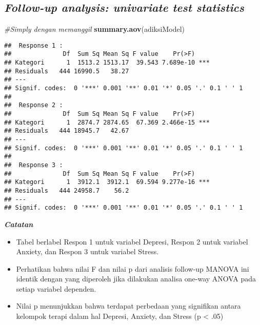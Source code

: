 \documentclass[
]{article}
\newenvironment{Shaded}{\begin{snugshade}}{\end{snugshade}}
\newcommand{\CommentTok}[1]{\textcolor[rgb]{0.56,0.35,0.01}{\textit{#1}}}
\newcommand{\KeywordTok}[1]{\textcolor[rgb]{0.13,0.29,0.53}{\textbf{#1}}}
\newcommand{\NormalTok}[1]{#1}
\begin{document}
\hypertarget{follow-up-analysis-univariate-test-statistics}{%
\subsection{\texorpdfstring{\emph{Follow-up analysis: univariate test
statistics}}{Follow-up analysis: univariate test statistics}}\label{follow-up-analysis-univariate-test-statistics}}

\begin{Shaded}
\begin{Highlighting}[]
\CommentTok{#Simply dengan memanggil }
\KeywordTok{summary.aov}\NormalTok{(adiksiModel)}
\end{Highlighting}
\end{Shaded}

\begin{verbatim}
##  Response 1 :
##              Df  Sum Sq Mean Sq F value    Pr(>F)    
## Kategori      1  1513.2 1513.17  39.543 7.689e-10 ***
## Residuals   444 16990.5   38.27                      
## ---
## Signif. codes:  0 '***' 0.001 '**' 0.01 '*' 0.05 '.' 0.1 ' ' 1
## 
##  Response 2 :
##              Df  Sum Sq Mean Sq F value    Pr(>F)    
## Kategori      1  2874.7 2874.65  67.369 2.466e-15 ***
## Residuals   444 18945.7   42.67                      
## ---
## Signif. codes:  0 '***' 0.001 '**' 0.01 '*' 0.05 '.' 0.1 ' ' 1
## 
##  Response 3 :
##              Df  Sum Sq Mean Sq F value    Pr(>F)    
## Kategori      1  3912.1  3912.1  69.594 9.277e-16 ***
## Residuals   444 24958.7    56.2                      
## ---
## Signif. codes:  0 '***' 0.001 '**' 0.01 '*' 0.05 '.' 0.1 ' ' 1
\end{verbatim}

\textbf{\emph{Catatan}}

\begin{itemize}
\item
  Tabel berlabel Respon 1 untuk variabel Depresi, Respon 2 untuk
  variabel Anxiety, dan Respon 3 untuk variabel Stress.
\item
  Perhatikan bahwa nilai F dan nilai p dari analisis follow-up MANOVA
  ini identik dengan yang diperoleh jika dilakukan analisa one-way ANOVA
  pada setiap variabel dependen.
\item
  Nilai p menunjukkan bahwa terdapat perbedaan yang signifikan antara
  kelompok terapi dalam hal Depresi, Anxiety, dan Stress (p \textless{}
  .05)
\end{itemize}
\end{document}
